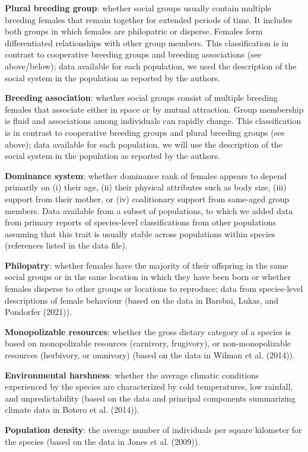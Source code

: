 \documentclass[
]{article}
\begin{document}
\textbf{Plural breeding group}: whether social groups usually contain
multiple breeding females that remain together for extended periods of
time. It includes both groups in which females are philopatric or
disperse. Females form differentiated relationships with other group
members. This classification is in contrast to cooperative breeding
groups and breeding associations (see above/below); data available for
each population, we used the description of the social system in the
population as reported by the authors.

\textbf{Breeding association}: whether social groups consist of multiple
breeding females that associate either in space or by mutual attraction.
Group membership is fluid and associations among individuals can rapidly
change. This classification is in contrast to cooperative breeding
groups and plural breeding groups (see above); data available for each
population, we will use the description of the social system in the
population as reported by the authors.

\textbf{Dominance system}: whether dominance rank of females appears to
depend primarily on (i) their age, (ii) their physical attributes such
as body size, (iii) support from their mother, or (iv) coalitionary
support from same-aged group members. Data available from a subset of
populations, to which we added data from primary reports of
species-level classifications from other populations assuming that this
trait is usually stable across populations within species (references
listed in the data file).

\textbf{Philopatry}: whether females have the majority of their
offspring in the same social groups or in the same location in which
they have been born or whether females disperse to other groups or
locations to reproduce; data from species-level descriptions of female
behaviour (based on the data in Barsbai, Lukas, and Pondorfer (2021)).

\textbf{Monopolizable resources}: whether the gross dietary category of
a species is based on monopolizable resources (carnivory, frugivory), or
non-monopolizable resources (herbivory, or omnivory) (based on the data
in Wilman et al. (2014)).

\textbf{Environmental harshness}: whether the average climatic
conditions experienced by the species are characterized by cold
temperatures, low rainfall, and unpredictability (based on the data and
principal components summarizing climate data in Botero et al. (2014)).

\textbf{Population density}: the average number of individuals per
square kilometer for the species (based on the data in Jones et al.
(2009)).
\end{document}
